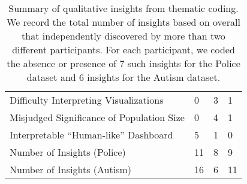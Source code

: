 \begin{table}[ht!]
\vspace{-10pt}
	\centering\scriptsize
	\begin{tabular}{l|l|l|l}
	& \system & \cluster & \BFS \\ \hline
	Difficulty Interpreting Visualizations & 0 & \cellcolor[HTML]{FD6864}3 & 1 \\ \hline
	Misjudged Significance of Population Size & 0 & \cellcolor[HTML]{FD6864}4 & 1 \\ \hline
	Interpretable ``Human-like'' Dashboard & \cellcolor[HTML]{9AFF99}5 & 1 & 0 \\ \hline
	Number of Insights (Police) & \cellcolor[HTML]{9AFF99}11 & 8 & 9 \\ \hline
	Number of Insights (Autism) & \cellcolor[HTML]{9AFF99}16 & 6 & 11 \\
	\end{tabular}
\caption{Summary of qualitative insights from thematic coding. We record the total number of insights based on overall  that  independently discovered by more than two different participants. For each participant, we coded the absence or presence of 7 such insights for the Police dataset and 6 insights for the Autism dataset.}%
\label{table:thematic_summary}
\vspace{-20pt}
\end{table}
